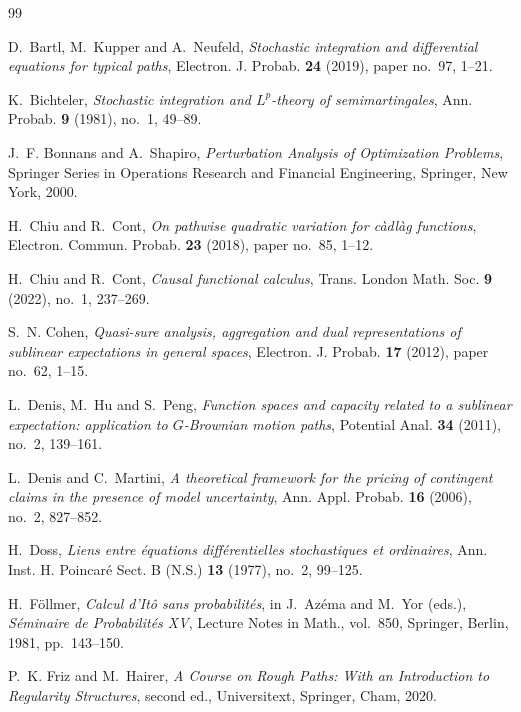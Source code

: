 \documentclass[11pt,reqno]{amsart}
\theoremstyle{plain}
\theoremstyle{definition}
\begin{document}
{
\begin{thebibliography}{99}
\scriptsize

D.~Bartl, M.~Kupper and A.~Neufeld,
\emph{Stochastic integration and differential equations for typical paths},
Electron. J. Probab. \textbf{24} (2019), paper no.~97, 1--21.

K.~Bichteler,
\emph{Stochastic integration and \(L^p\)-theory of semimartingales},
Ann. Probab. \textbf{9} (1981), no.~1, 49--89.

J.~F. Bonnans and A.~Shapiro,
\emph{Perturbation Analysis of Optimization Problems},
Springer Series in Operations Research and Financial Engineering,
Springer, New York, 2000.

H.~Chiu and R.~Cont,
\emph{On pathwise quadratic variation for c\`adl\`ag functions},
Electron. Commun. Probab. \textbf{23} (2018), paper no.~85, 1--12.

H.~Chiu and R.~Cont,
\emph{Causal functional calculus},
Trans. London Math. Soc. \textbf{9} (2022), no.~1, 237--269.

S.~N. Cohen,
\emph{Quasi-sure analysis, aggregation and dual representations of
sublinear expectations in general spaces},
Electron. J. Probab. \textbf{17} (2012), paper no.~62, 1--15.

L.~Denis, M.~Hu and S.~Peng,
\emph{Function spaces and capacity related to a sublinear expectation:
application to \(G\)-Brownian motion paths},
Potential Anal. \textbf{34} (2011), no.~2, 139--161.

L.~Denis and C.~Martini,
\emph{A theoretical framework for the pricing of contingent claims
in the presence of model uncertainty},
Ann. Appl. Probab. \textbf{16} (2006), no.~2, 827--852.

H.~Doss,
\emph{Liens entre \'equations diff\'erentielles stochastiques et ordinaires},
Ann. Inst. H. Poincar\'e Sect. B (N.S.) \textbf{13} (1977), no.~2, 99--125.

H.~F{\"o}llmer,
\emph{Calcul d'It{\^o} sans probabilit{\'e}s},
in J.~Az{\'e}ma and M.~Yor (eds.),
\emph{S{\'e}minaire de Probabilit{\'e}s XV},
Lecture Notes in Math., vol.~850, Springer, Berlin, 1981, pp.~143--150.

P.~K. Friz and M.~Hairer,
\emph{A Course on Rough Paths: With an Introduction to Regularity
Structures}, second ed., Universitext, Springer, Cham, 2020.


\end{thebibliography}}
\end{document}
